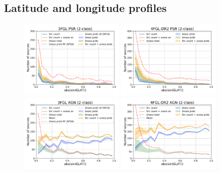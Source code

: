 \subsection{Latitude and longitude profiles}

\begin{figure}[h]
\center
\includegraphics[width=0.45\textwidth]{plots/lat_profile_PSR_3FGL_2classes.pdf}
\includegraphics[width=0.45\textwidth]{plots/lat_profile_PSR_4FGL-DR2_2classes.pdf} \\
\includegraphics[width=0.45\textwidth]{plots/lat_profile_AGN_3FGL_2classes.pdf}
\includegraphics[width=0.45\textwidth]{plots/lat_profile_AGN_4FGL-DR2_2classes.pdf}

\end{figure}
